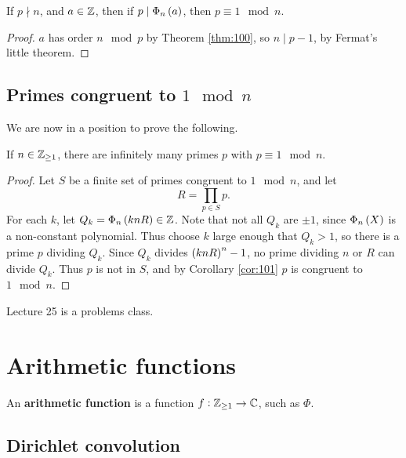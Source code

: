\begin{corollary}
\label{cor:101}
If $ p \nmid n $, and $ a \in \mathbb{Z} $, then if $ p \mid \Phi_n\br{a} $, then $ p \equiv 1 \mod n $.
\end{corollary}

\begin{proof}
$ a $ has order $ n \mod p $ by Theorem \ref{thm:100}, so $ n \mid p - 1 $, by Fermat's little theorem.
\end{proof}

\subsection{Primes congruent to \texorpdfstring{$ 1 \mod n $}{1 mod n}}

We are now in a position to prove the following.

\begin{theorem}
If $ n \in \mathbb{Z}_{\ge 1} $, there are infinitely many primes $ p $ with $ p \equiv 1 \mod n $.
\end{theorem}

\begin{proof}
Let $ S $ be a finite set of primes congruent to $ 1 \mod n $, and let
$$ R = \prod_{p \in S} p. $$
For each $ k $, let $ Q_k = \Phi_n\br{knR} \in \ZZ $. Note that not all $ Q_k $ are $ \pm 1 $, since $ \Phi_n\br{X} $ is a non-constant polynomial. Thus choose $ k $ large enough that $ Q_k > 1 $, so there is a prime $ p $ dividing $ Q_k $. Since $ Q_k $ divides $ \br{knR}^n - 1 $, no prime dividing $ n $ or $ R $ can divide $ Q_k $. Thus $ p $ is not in $ S $, and by Corollary \ref{cor:101} $ p $ is congruent to $ 1 \mod n $.
\end{proof}


Lecture 25 is a problems class.

\pagebreak

\section{Arithmetic functions}


An \textbf{arithmetic function} is a function $ f : \mathbb{Z}_{\ge 1} \to \mathbb{C} $, such as $ \Phi $.

\subsection{Dirichlet convolution}


